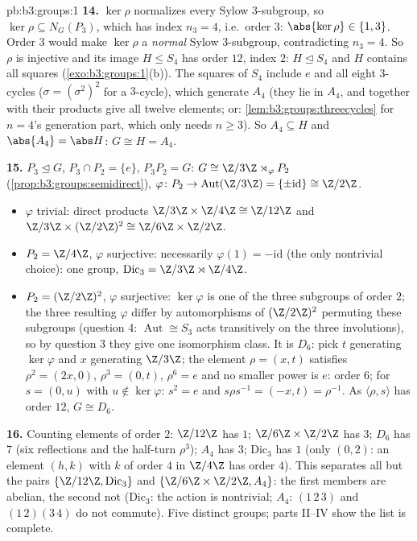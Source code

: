 \begin{solution}{pb:b3:groups:1}
\textbf{14.} $\ker\rho$ normalizes every Sylow $3$-subgroup, so
$\ker \rho \subseteq N_G(P_3)$, which has index $n_3 = 4$, i.e.\
order $3$: $\abs{\ker\rho} \in \{1, 3\}$. Order $3$ would make
$\ker\rho$ a \emph{normal} Sylow $3$-subgroup, contradicting $n_3
= 4$. So $\rho$ is injective and its image $H \leq S_4$ has order
$12$, index $2$: $H \trianglelefteq S_4$ and $H$ contains all
squares (\cref{exo:b3:groups:1}(b)). The squares of $S_4$ include
$e$ and all eight $3$-cycles ($\sigma = (\sigma^2)^2$ for a
$3$-cycle), which generate $A_4$ (they lie in $A_4$, and together
with their products give all twelve elements; or:
\cref{lem:b3:groups:threecycles} for $n = 4$'s generation part,
which only needs $n \geq 3$). So $A_4 \subseteq H$ and $\abs{A_4}
= \abs H$: $G \cong H = A_4$.

\textbf{15.} $P_3 \trianglelefteq G$, $P_3 \cap P_2 = \{e\}$,
$P_3P_2 = G$: $G \cong \Z/3\Z \rtimes_\varphi P_2$
(\cref{prop:b3:groups:semidirect}), $\varphi \colon P_2 \to
\operatorname{Aut}(\Z/3\Z) = \{\pm\mathrm{id}\} \cong \Z/2\Z$.
\begin{itemize}
  \item $\varphi$ trivial: direct products $\Z/3\Z \times \Z/4\Z
        \cong \Z/12\Z$ and $\Z/3\Z \times (\Z/2\Z)^2 \cong \Z/6\Z
        \times \Z/2\Z$.
  \item $P_2 = \Z/4\Z$, $\varphi$ surjective: necessarily
        $\varphi(1) = -\mathrm{id}$ (the only nontrivial choice):
        one group, $\mathrm{Dic}_3 = \Z/3\Z \rtimes \Z/4\Z$.
  \item $P_2 = (\Z/2\Z)^2$, $\varphi$ surjective: $\ker\varphi$ is
        one of the three subgroups of order $2$; the three
        resulting $\varphi$ differ by automorphisms of $(\Z/2\Z)^2$
        permuting these subgroups (question 4: $\operatorname{Aut}
        \cong S_3$ acts transitively on the three involutions), so
        by question 3 they give one isomorphism class. It is
        $D_6$: pick $t$ generating $\ker\varphi$ and $x$
        generating $\Z/3\Z$; the element $\rho = (x, t)$ satisfies
        $\rho^2 = (2x, 0)$, $\rho^3 = (0, t)$, $\rho^6 = e$ and no
        smaller power is $e$: order $6$; for $s = (0, u)$ with $u
        \notin \ker\varphi$: $s^2 = e$ and $s\rho s^{-1} = (-x, t)
        = \rho^{-1}$. As $\langle \rho, s\rangle$ has order $12$,
        $G \cong D_6$.
\end{itemize}

\textbf{16.} Counting elements of order $2$: $\Z/12\Z$ has $1$;
$\Z/6\Z\times\Z/2\Z$ has $3$; $D_6$ has $7$ (six reflections and
the half-turn $\rho^3$); $A_4$ has $3$; $\mathrm{Dic}_3$ has $1$
(only $(0, 2)$: an element $(h, k)$ with $k$ of order $4$ in
$\Z/4\Z$ has order $4$). This separates all but the pairs
$\{\Z/12\Z, \mathrm{Dic}_3\}$ and $\{\Z/6\Z\times\Z/2\Z, A_4\}$:
the first members are abelian, the second not ($\mathrm{Dic}_3$:
the action is nontrivial; $A_4$: $(1\,2\,3)$ and
$(1\,2)(3\,4)$ do not commute). Five distinct groups; parts
II--IV show the list is complete.


\end{solution}
